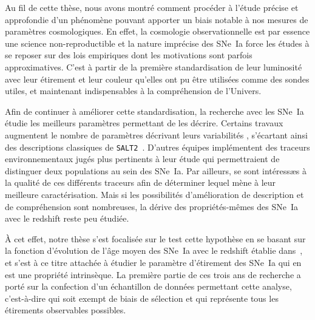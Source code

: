 \documentclass[../main/main.tex]{subfiles}
\begin{document}


Au fil de cette thèse, nous avons montré comment procéder à l'étude précise et
approfondie d'un phénomène pouvant apporter un biais notable à nos mesures de
paramètres cosmologiques. En effet, la cosmologie observationnelle est par
essence une science non-reproductible et la nature imprécise des SNe~Ia force
les études à se reposer sur des lois empiriques dont les motivations sont
parfois approximatives. C'est à partir de la première standardisation de leur
luminosité avec leur étirement et leur couleur qu'elles ont pu être utilisées
comme des sondes utiles, et maintenant indispensables à la compréhension de
l'Univers.

Afin de continuer à améliorer cette standardisation, la recherche avec les
SNe~Ia étudie les meilleurs paramètres permettant de les décrire. Certains
travaux augmentent le nombre de paramètres décrivant leurs variabilités
\citep[c'est le cas de SUGAR, décrit dans][]{leget2020}, s'écartant ainsi des
descriptions classiques de \texttt{SALT2}~\citep{guy2007}. D'autres équipes
implémentent des traceurs environnementaux jugés plus pertinents à leur étude
\citep[par exemple, le LsSFR ou la masse de la galaxie hôte
dans][respectivement]{rigault2013, childress2013} qui permettraient de
distinguer deux populations au sein des SNe~Ia. Par ailleurs, \cite{briday2022}
se sont intéressæs à la qualité de ces différents traceurs afin de déterminer
lequel mène à leur meilleure caractérisation. Mais si les possibilités
d'amélioration de description et de compréhension sont nombreuses, la dérive des
propriétés-mêmes des SNe~Ia avec le redshift reste peu étudiée.

À cet effet, notre thèse s'est focalisée sur le test cette hypothèse en se
basant sur la fonction d'évolution de l'âge moyen des SNe~Ia avec le redshift
établie dans~\cite{rigault2020}, et s'est à ce titre attachée à étudier le
paramètre d'étirement des SNe~Ia qui en est une propriété intrinsèque. La
première partie de ces trois ans de recherche a porté sur la confection d'un
échantillon de données permettant cette analyse, c'est-à-dire qui soit exempt de
biais de sélection et qui représente tous les étirements observables possibles.
\end{document}
